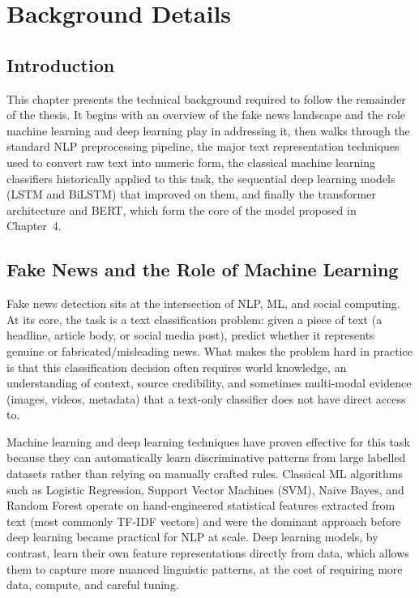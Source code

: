 \sloppy
\chapter{Background Details}
\section{Introduction}

This chapter presents the technical background required to follow the remainder of the thesis. It begins with an overview of the fake news landscape and the role machine learning and deep learning play in addressing it, then walks through the standard NLP preprocessing pipeline, the major text representation techniques used to convert raw text into numeric form, the classical machine learning classifiers historically applied to this task, the sequential deep learning models (LSTM and BiLSTM) that improved on them, and finally the transformer architecture and BERT, which form the core of the model proposed in Chapter~4.

\section{Fake News and the Role of Machine Learning}

Fake news detection sits at the intersection of NLP, ML, and social computing. At its core, the task is a text classification problem: given a piece of text (a headline, article body, or social media post), predict whether it represents genuine or fabricated/misleading news. What makes the problem hard in practice is that this classification decision often requires world knowledge, an understanding of context, source credibility, and sometimes multi-modal evidence (images, videos, metadata) that a text-only classifier does not have direct access to.

Machine learning and deep learning techniques have proven effective for this task because they can automatically learn discriminative patterns from large labelled datasets rather than relying on manually crafted rules. Classical ML algorithms such as Logistic Regression, Support Vector Machines (SVM), Naive Bayes, and Random Forest operate on hand-engineered statistical features extracted from text (most commonly TF-IDF vectors) and were the dominant approach before deep learning became practical for NLP at scale. Deep learning models, by contrast, learn their own feature representations directly from data, which allows them to capture more nuanced linguistic patterns, at the cost of requiring more data, compute, and careful tuning.

